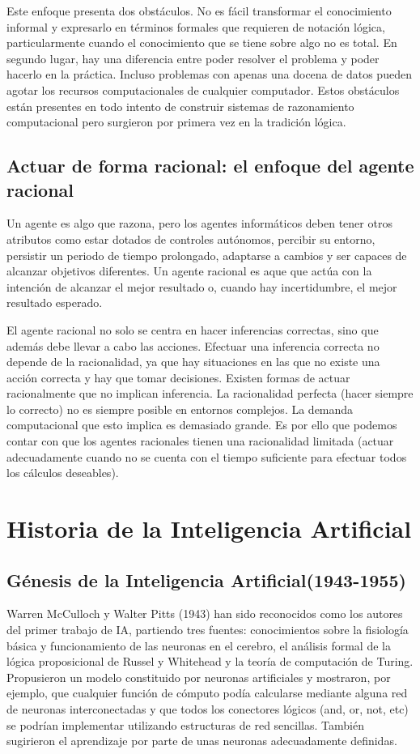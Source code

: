 \documentclass[12pt,a4paper]{article}
\begin{document}
Este enfoque presenta dos obstáculos. No es fácil transformar el conocimiento informal y expresarlo en términos formales que requieren de notación lógica, particularmente cuando el conocimiento que se tiene sobre algo no es total. En segundo lugar, hay una diferencia entre poder resolver el problema y poder hacerlo en la práctica. Incluso problemas con apenas una docena de datos pueden agotar los recursos computacionales de cualquier computador. Estos obstáculos están presentes en todo intento de construir sistemas de razonamiento computacional pero surgieron por primera vez en la tradición lógica.

\subsection{Actuar de forma racional: el enfoque del agente racional}
Un agente es algo que razona, pero los agentes informáticos deben tener otros atributos como estar dotados de controles autónomos, percibir su entorno, persistir un periodo de tiempo prolongado, adaptarse a cambios y ser capaces de alcanzar objetivos diferentes. Un agente racional es aque que actúa con la intención de alcanzar el mejor resultado o, cuando hay incertidumbre, el mejor resultado esperado.

El agente racional no solo se centra en hacer inferencias correctas, sino que además debe llevar a cabo las acciones. Efectuar una inferencia correcta no depende de la racionalidad, ya que hay situaciones en las que no existe una acción correcta y hay que tomar decisiones. Existen formas de actuar racionalmente que no implican inferencia. La racionalidad perfecta (hacer siempre lo correcto) no es siempre posible en entornos complejos. La demanda computacional que esto implica es demasiado grande. Es por ello que podemos contar con que los agentes racionales tienen una racionalidad limitada (actuar adecuadamente cuando no se cuenta con el tiempo suficiente para efectuar todos los cálculos deseables).

\section{Historia de la Inteligencia Artificial}
\subsection{Génesis de la Inteligencia Artificial(1943-1955)}
Warren McCulloch y Walter Pitts (1943) han sido reconocidos como los autores del primer trabajo de IA, partiendo tres fuentes: conocimientos sobre la fisiología básica y funcionamiento de las neuronas en el cerebro, el análisis formal de la lógica proposicional de Russel y Whitehead y la teoría de computación de Turing. Propusieron un modelo constituido por neuronas artificiales y mostraron, por ejemplo, que cualquier función de cómputo podía calcularse mediante alguna red de neuronas interconectadas y que todos los conectores lógicos (and, or, not, etc) se podrían implementar utilizando estructuras de red sencillas. También sugirieron el aprendizaje por parte de unas neuronas adecuadamente definidas.
\end{document}
